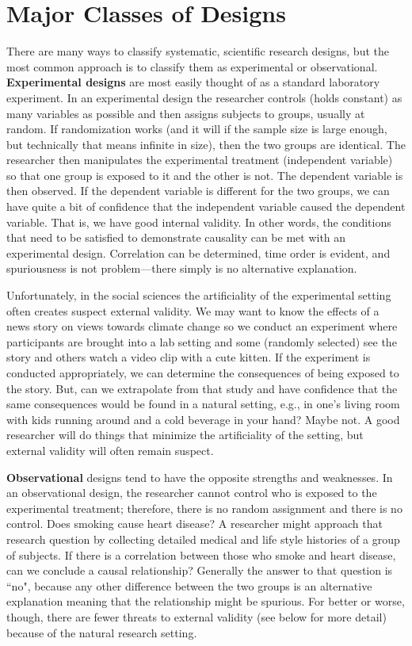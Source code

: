 \documentclass[11pt,openany]{book}\usepackage[]{graphicx}\usepackage[]{color}
\begin{document}
\section{Major Classes of Designs}

There are many ways to classify systematic, scientific research designs, but the most common approach is to classify them as experimental or observational. \textbf{Experimental designs} are most easily thought of as a standard laboratory experiment. In an experimental design the researcher controls (holds constant) as many variables as possible and then assigns subjects to groups, usually at random. If randomization works (and it will if the sample size is large enough, but technically that means infinite in size), then the two groups are identical. The researcher then manipulates the experimental treatment (independent variable) so that one group is exposed to it and the other is not. The dependent variable is then observed. If the dependent variable is different for the two groups, we can have quite a bit of confidence that the independent variable caused the dependent variable. That is, we have good internal validity. In other words, the conditions that need to be satisfied to demonstrate causality can be met with an experimental design. Correlation can be determined, time order is evident, and spuriousness is not problem---there simply is no alternative explanation.

Unfortunately, in the social sciences the artificiality of the experimental setting often creates suspect external validity. We may want to know the effects of a news story on views towards climate change so we conduct an experiment where participants are brought into a lab setting and some (randomly selected) see the story and others watch a video clip with a cute kitten. If the experiment is conducted appropriately, we can determine the consequences of being exposed to the story. But, can we extrapolate from that study and have confidence that the same consequences would be found in a natural setting, e.g., in one's living room with kids running around and a cold beverage in your hand? Maybe not. A good researcher will do things that minimize the artificiality of the setting, but external validity will often remain suspect. 
  
\textbf{Observational} designs tend to have the opposite strengths and weaknesses. In an observational design, the researcher cannot control who is exposed to the experimental treatment; therefore, there is no random assignment and there is no control. Does smoking cause heart disease?  A researcher might approach that research question by collecting detailed medical and life style histories of a group of subjects. If there is a correlation between those who smoke and heart disease, can we conclude a causal relationship?  Generally the answer to that question is ``no", because any other difference between the two groups is an alternative explanation meaning that the relationship might be spurious. For better or worse, though, there are fewer threats to external validity (see below for more detail) because of the natural research setting.
  
\end{document}
